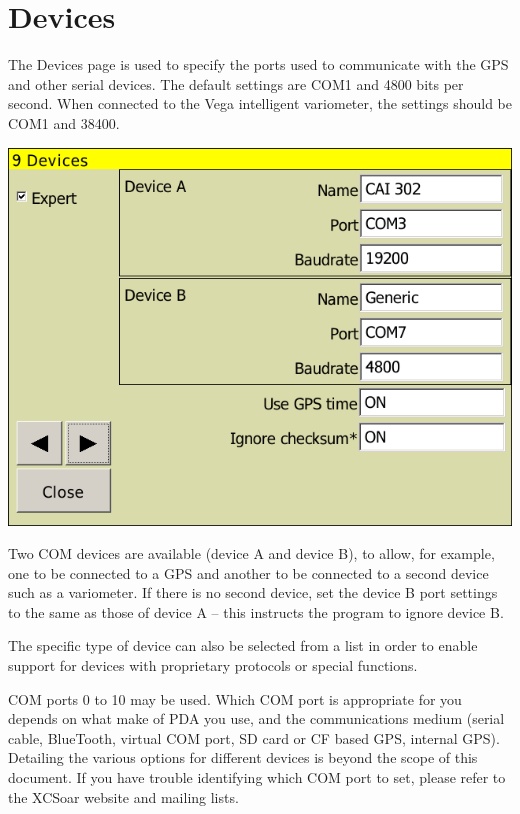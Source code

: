 \documentclass[a4paper,12pt]{refrep}
\begin{document}
\clearpage
\section{Devices}

The Devices page is used to specify the ports used to communicate with
the GPS and other serial devices. The default settings are COM1 and
4800 bits per second.  When connected to the Vega intelligent
variometer, the settings should be COM1 and 38400.

\begin{center}
\includegraphics[angle=0,width=\linewidth,keepaspectratio='true']{figures/config-devices.png}
\end{center}

Two COM devices are available (device A and device B), to allow, for
example, one to be connected to a GPS and another to be connected to a
second device such as a variometer.  If there is no second device, set
the device B port settings to the same as those of device A -- this
instructs the program to ignore device B.

The specific type of device can also be selected from a list in order
to enable support for devices with proprietary protocols or special
functions.

COM ports 0 to 10 may be used.  Which COM port is appropriate for you
depends on what make of PDA you use, and the communications medium
(serial cable, BlueTooth, virtual COM port, SD card or CF based GPS,
internal GPS).  Detailing the various options for different devices is
beyond the scope of this document.  If you have trouble identifying
which COM port to set, please refer to the XCSoar website and mailing
lists.
\end{document}
